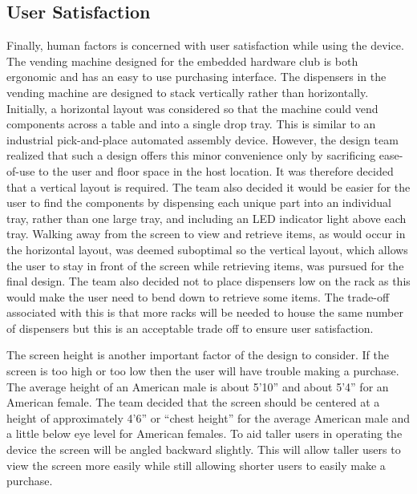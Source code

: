 \documentclass[12pt,oneside,final]{article}
\begin{document}
\subsection{User Satisfaction}
Finally, human factors is concerned with user satisfaction while using the device. The vending machine designed for the embedded hardware club is both ergonomic and has an easy to use purchasing interface. The dispensers in the vending machine are designed to stack vertically rather than horizontally. Initially, a horizontal layout was considered so that the machine could vend components across a table and into a single drop tray. This is similar to an industrial pick-and-place automated assembly device. However, the design team realized that such a design offers this minor convenience only by sacrificing ease-of-use to the user and floor space in the host location. It was therefore decided that a vertical layout is required. The team also decided it would be easier for the user to find the components by dispensing each unique part into an individual tray, rather than one large tray, and including an LED indicator light above each tray. Walking away from the screen to view and retrieve items, as would occur in the horizontal layout, was deemed suboptimal so the vertical layout, which allows the user to stay in front of the screen while retrieving items, was pursued for the final design. The team also decided not to place dispensers low on the rack as this would make the user need to bend down to retrieve some items. The trade-off associated with this is that more racks will be needed to house the same number of dispensers but this is an acceptable trade off to ensure user satisfaction.

The screen height is another important factor of the design to consider. If the screen is too high or too low then the user will have trouble making a purchase. The average height of an American male is about 5'10'' and about 5'4'' for an American female. The team decided that the screen should be centered at a height of approximately 4'6'' or ``chest height'' for the average American male and a little below eye level for American females. To aid taller users in operating the device the screen will be angled backward slightly. This will allow taller users to view the screen more easily while still allowing shorter users to easily make a purchase.
\end{document}
